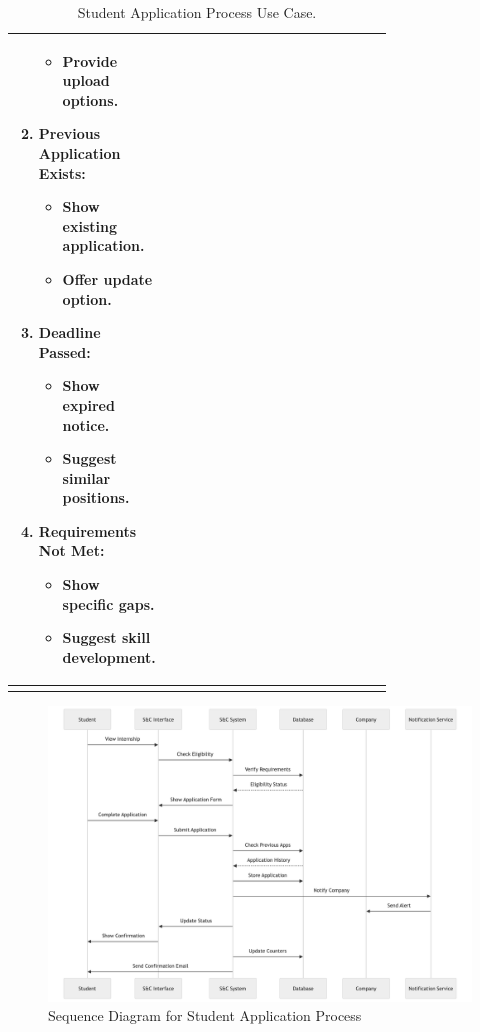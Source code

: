 \begin{center}
\begin{longtable}{|l|p{0.75\linewidth}|}
\begin{enumerate}
\begin{itemize}
                \item Provide upload options.
            \end{itemize} 
            \item \textbf{Previous Application Exists:} \begin{itemize}
                \item Show existing application.
                \item Offer update option.
            \end{itemize} 
            \item \textbf{Deadline Passed:} 
            \begin{itemize}
                \item Show expired notice.
                \item Suggest similar positions.
            \end{itemize} 
            \item \textbf{Requirements Not Met:} 
            \begin{itemize}
                \item Show specific gaps.
                \item Suggest skill development.
            \end{itemize} 
        \end{enumerate} \\
        \hline
        \caption{Student Application Process Use Case.}
        \label{tab:student_application_process_use_case}
    \end{longtable}
\end{center}


\begin{figure}[H]
    \begin{center}
        \includegraphics[width=1\linewidth]{JhaBhatiaSharma/Images/Sequence Diagrams/StudentApplication.png}
        \caption{Sequence Diagram for Student Application Process}
        \label{fig:create_a_Tournament_seqd}%
    \end{center}
\end{figure}

